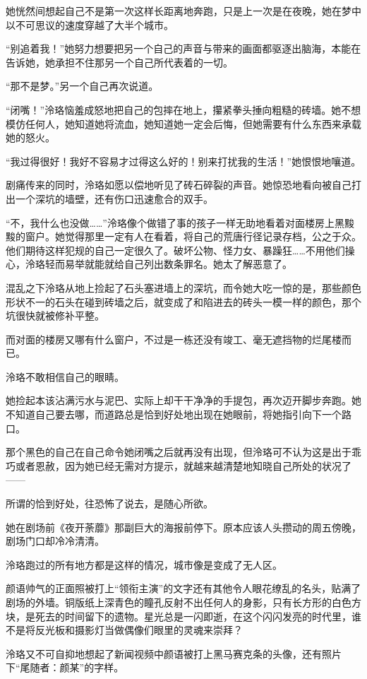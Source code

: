 \documentclass[UTF8, scheme = chinese, openany]{ctexbook}
\begin{document}
她恍然间想起自己不是第一次这样长距离地奔跑，只是上一次是在夜晚，她在梦中以不可思议的速度穿越了大半个城市。

“别追着我！”她努力想要把另一个自己的声音与带来的画面都驱逐出脑海，本能在告诉她，她承担不住那另一个自己所代表着的一切。

“那不是梦。”另一个自己再次说道。

“闭嘴！”泠珞恼羞成怒地把自己的包摔在地上，攥紧拳头捶向粗糙的砖墙。她不想模仿任何人，她知道她将流血，她知道她一定会后悔，但她需要有什么东西来承载她的怒火。

“我过得很好！我好不容易才过得这么好的！别来打扰我的生活！”她恨恨地嚷道。

剧痛传来的同时，泠珞如愿以偿地听见了砖石碎裂的声音。她惊恐地看向被自己打出一个深坑的墙壁，还有伤口迅速愈合的双手。

“不，我什么也没做……”泠珞像个做错了事的孩子一样无助地看着对面楼房上黑黢黢的窗户。她觉得那里一定有人在看着，将自己的荒唐行径记录存档，公之于众。他们期待这样犯规的自己一定很久了。破坏公物、怪力女、暴躁狂……不用他们操心，泠珞轻而易举就能就给自己列出数条罪名。她太了解恶意了。

混乱之下泠珞从地上捡起了石头塞进墙上的深坑，而令她大吃一惊的是，那些颜色形状不一的石头在碰到砖墙之后，就变成了和陷进去的砖头一模一样的颜色，那个坑很快就被修补平整。

而对面的楼房又哪有什么窗户，不过是一栋还没有竣工、毫无遮挡物的烂尾楼而已。

泠珞不敢相信自己的眼睛。

她捡起本该沾满污水与泥巴、实际上却干干净净的手提包，再次迈开脚步奔跑。她不知道自己要去哪，而道路总是恰到好处地出现在她眼前，将她指引向下一个路口。

那个黑色的自己在自己命令她闭嘴之后就再没有出现，但泠珞可不认为这是出于乖巧或者恩赦，因为她已经无需对方提示，就越来越清楚地知晓自己所处的状况了——

所谓的恰到好处，往恐怖了说去，是随心所欲。

她在剧场前《夜开荼蘼》那副巨大的海报前停下。原本应该人头攒动的周五傍晚，剧场门口却冷冷清清。

泠珞跑过的所有地方都是这样的情况，城市像是变成了无人区。

颜语帅气的正面照被打上“领衔主演”的文字还有其他令人眼花缭乱的名头，贴满了剧场的外墙。铜版纸上深青色的瞳孔反射不出任何人的身影，只有长方形的白色方块，是死去的时间留下的遗物。星光总是一闪即逝，在这个闪闪发亮的时代里，谁不是将反光板和摄影灯当做偶像们眼里的灵魂来崇拜？

泠珞又不可自抑地想起了新闻视频中颜语被打上黑马赛克条的头像，还有照片下“尾随者：颜某”的字样。
\end{document}
